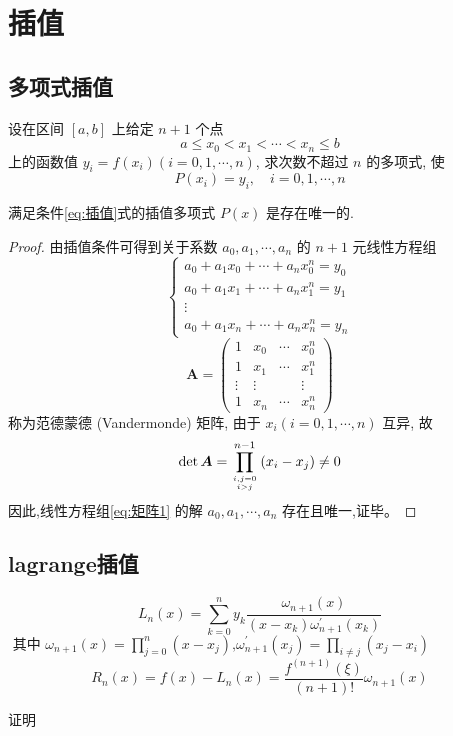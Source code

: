\section{插值}
\subsection{多项式插值}
设在区间 $[a, b]$ 上给定 $n+1$ 个点
$$
a \leq x_{0}<x_{1}<\cdots<x_{n} \leq b
$$
上的函数值 $y_{i}=f\left(x_{i}\right)(i=0,1, \cdots, n)$, 求次数不超过 $n$ 的多项式, 使
\begin{equation}
P\left(x_{i}\right)=y_{i}, \quad i=0,1, \cdots, n
  \label{eq:插值}
\end{equation}
\begin{theorem}[插值多项式的唯一性]
 满足条件\ref{eq:插值}式的插值多项式 $P(x)$ 是存在唯一的. 
\end{theorem}

\begin{proof}
 由插值条件可得到关于系数 $a_{0}, a_{1}, \cdots, a_{n}$ 的 $n+1$ 元线性方程组
\begin{equation}
\left\{\begin{array}{l}
a_{0}+a_{1} x_{0}+\cdots+a_{n} x_{0}^{n}=y_{0} \\
a_{0}+a_{1} x_{1}+\cdots+a_{n} x_{1}^{n}=y_{1} \\
\vdots \\
a_{0}+a_{1} x_{n}+\cdots+a_{n} x_{n}^{n}=y_{n}
\end{array}\right.
  \label{eq:矩阵1}
\end{equation}
$$
\boldsymbol{A}=\left(\begin{array}{cccc}
1 & x_{0} & \cdots & x_{0}^{n} \\
1 & x_{1} & \cdots & x_{1}^{n} \\
\vdots & \vdots & & \vdots \\
1 & x_{n} & \cdots & x_{n}^{n}
\end{array}\right)
$$
称为范德蒙德 (Vandermonde) 矩阵, 由于 $x_{i}(i=0,1, \cdots, n)$ 互异, 故
$$
\operatorname{det} \boldsymbol{A}=\prod_{i, j=0 \atop i>j}^{n-1}\left(x_{i}-x_{j}\right) \neq 0
$$
因此,线性方程组\ref{eq:矩阵1} 的解 $a_{0}, a_{1}, \cdots, a_{n}$ 存在且唯一,证毕。
\end{proof}

\subsection{lagrange插值}
$$
L_{n}(x)=\sum_{k=0}^{n} y_{k} \frac{\omega_{n+1}(x)}{\left(x-x_{k}\right) \omega_{n+1}^{\prime}\left(x_{k}\right)}
$$
$
\text { 其中 } \omega_{n+1}(x)=\prod_{j=0}^{n}\left(x-x_{j}\right) \text {,} \omega_{n+1}^{\prime}\left(x_{j}\right)=\prod_{i \neq j}\left(x_{j}-x_{i}\right)
$
$$
R_{n}(x)=f(x)-L_{n}(x)=\frac{f^{(n+1)}(\xi)}{(n+1) !} \omega_{n+1}(x)
$$
\begin{note}
 证明
\end{note}


